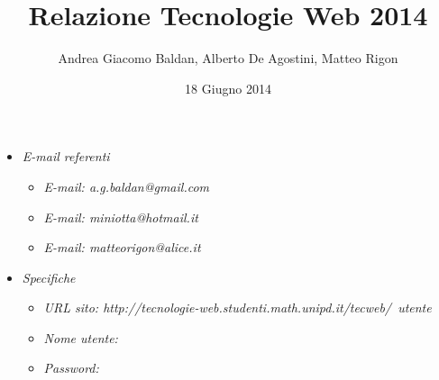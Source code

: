 \documentclass[a4paper]{article}
\title{Relazione Tecnologie Web 2014}
\author{Andrea Giacomo Baldan, Alberto De Agostini, Matteo Rigon}
\date{18 Giugno 2014}
\begin{document}
\maketitle

\begin{itemize}
\item \emph{E-mail referenti}
  \begin{itemize}
  \item \emph{E-mail: a.g.baldan@gmail.com}
  \item \emph{E-mail: miniotta@hotmail.it}
  \item \emph{E-mail: matteorigon@alice.it}
  \end{itemize}
\item \emph{Specifiche}
  \begin{itemize}
  \item \emph{URL sito: http://tecnologie-web.studenti.math.unipd.it/tecweb/~utente}
  \item \emph{Nome utente: }
  \item \emph{Password: }
  \end{itemize}
\end{itemize}

%
%
%
%
\end{document}
